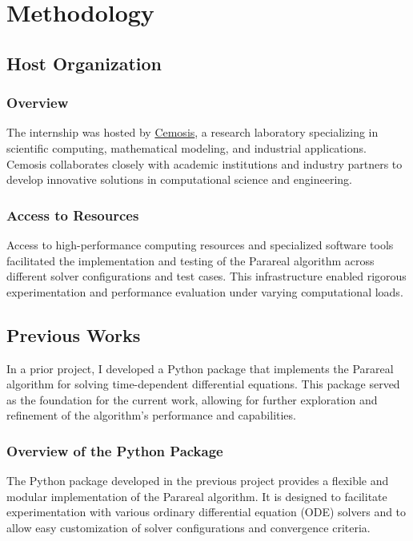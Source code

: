 \documentclass[a4paper,12pt,french]{article}
\begin{document}


\section{Methodology}
\subsection{Host Organization}
\subsubsection{Overview}
The internship was hosted by \hyperlink{https://www.cemosis.fr/}{Cemosis}, a research laboratory specializing in scientific computing, mathematical modeling, and industrial applications. Cemosis collaborates closely with academic institutions and industry partners to develop innovative solutions in computational science and engineering.
\subsubsection{Access to Resources}
Access to high-performance computing resources and specialized software tools facilitated the implementation and testing of the Parareal algorithm across different solver configurations and test cases. This infrastructure enabled rigorous experimentation and performance evaluation under varying computational loads.

\subsection{Previous Works}
In a prior project, I developed a Python package that implements the Parareal algorithm for solving time-dependent differential equations. This package served as the foundation for the current work, allowing for further exploration and refinement of the algorithm's performance and capabilities.

\subsubsection{Overview of the Python Package}
The Python package developed in the previous project provides a flexible and modular implementation of the Parareal algorithm. It is designed to facilitate experimentation with various ordinary differential equation (ODE) solvers and to allow easy customization of solver configurations and convergence criteria.
\end{document}
